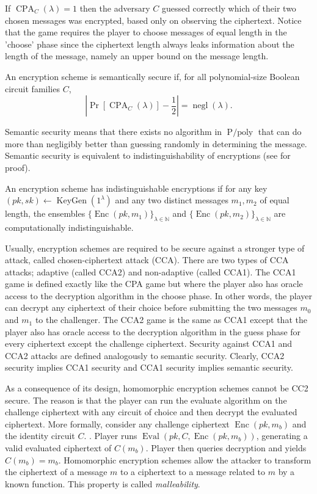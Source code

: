 If $\operatorname{CPA}_{C}(\lambda) = 1$ then the adversary $C$ guessed correctly which of their two chosen messages was encrypted, based only on observing the ciphertext. Notice that the game requires the player to choose messages of equal length in the 'choose' phase since the ciphertext length always leaks information about the length of the message, namely an upper bound on the message length.
\begin{definition}
    An encryption scheme is semantically secure if, for all polynomial-size Boolean circuit families $C$, $$| \operatorname{Pr}[\operatorname{CPA}_{C}(\lambda)] - \frac{1}{2} | = \operatorname{negl}(\lambda).$$
\end{definition}
Semantic security means that there exists no algorithm in $\operatorname{P/poly}$ that can do more than negligibly better than guessing randomly in determining the message. Semantic security is equivalent to indistinguishability of encryptions (see \cite{Gol04} for proof).
\begin{definition}
    An encryption scheme has indistinguishable encryptions if for any key $(pk,sk) \leftarrow \operatorname{KeyGen}(1^{\lambda})$ and any two distinct messages $m_1, m_2$ of equal length, the ensembles $\{\operatorname{Enc}(pk,m_1)\}_{\lambda \in \mathbb{N}}$ and $\{\operatorname{Enc}(pk,m_2)\}_{\lambda \in \mathbb{N}}$ are computationally indistinguishable.
\end{definition}
Usually, encryption schemes are required to be secure against a stronger type of attack, called chosen-ciphertext attack (CCA). There are two types of CCA attacks; adaptive (called CCA2) and non-adaptive (called CCA1). The CCA1 game is defined exactly like the CPA game but where the player also has oracle access to the decryption algorithm in the choose phase. In other words, the player can decrypt any ciphertext of their choice before submitting the two messages $m_0$ and $m_1$ to the challenger. The CCA2 game is the same as CCA1 except that the player also has oracle access to the decryption algorithm in the guess phase for every ciphertext except the challenge ciphertext. Security against CCA1 and CCA2 attacks are defined analogously to semantic security. Clearly, CCA2 security implies CCA1 security and CCA1 security implies semantic security.

As a consequence of its design, homomorphic encryption schemes cannot be CC2 secure. The reason is that the player can run the evaluate algorithm on the challenge ciphertext with any circuit of choice and then decrypt the evaluated ciphertext. More formally, consider any challenge ciphertext $\operatorname{Enc}(pk,m_b)$ and the identity circuit $C$. . Player runs $\operatorname{Eval}(pk,C,\operatorname{Enc}(pk,m_b))$, generating a valid evaluated ciphertext of $C(m_b)$. Player then queries decryption and yields $C(m_b) = m_b$. Homomorphic encryption schemes allow the attacker to transform the ciphertext of a message $m$ to a ciphertext to a message related to $m$ by a known function. This property is called \emph{malleability}.

